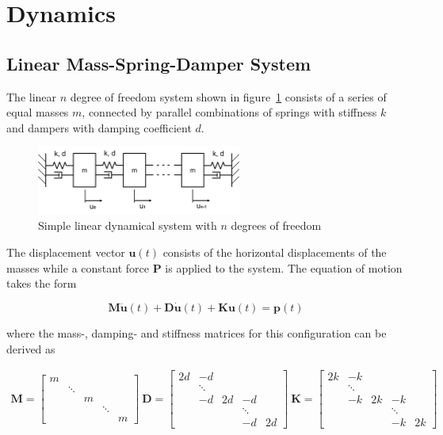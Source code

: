 \newpage
\section{Dynamics}

\subsection*{Linear Mass-Spring-Damper System}

The linear $n$ degree of freedom system shown in figure~\ref{fig:verification:linear-fmd} consists of a series of equal masses $m$, connected by parallel combinations of springs with stiffness $k$ and dampers with damping coefficient $d$.

\begin{figure}[h]
\centering
\includegraphics[width=0.6\textwidth]{figures/verification/mass-spring-damper}
\caption{Simple linear dynamical system with $n$ degrees of freedom}
\label{fig:verification:linear-fmd}
\end{figure}

The displacement vector $\boldsymbol{u}(t)$ consists of the horizontal displacements of the masses while a constant force $\boldsymbol{P}$ is applied to the system.
The equation of motion takes the form

\begin{equation}
\boldsymbol{M}\ddot{\boldsymbol{u}}(t) + \boldsymbol{D}\dot{\boldsymbol{u}}(t) + \boldsymbol{K}\boldsymbol{u}(t) = \boldsymbol{p}(t) \label{eq:verification:linear-fmd}
\end{equation}

where the mass-, damping- and stiffness matrices for this configuration can be derived as

\begin{align}
\boldsymbol{M} =
\begin{bmatrix}
m \\
& \ddots \\
&& m \\
&&& \ddots \\
&&&& m
\end{bmatrix}
 \
\boldsymbol{D} =
\begin{bmatrix}
2d & -d \\
& \ddots \\
& -d & 2d & -d \\
&&& \ddots \\
&&& -d & 2d
\end{bmatrix}
 \
\boldsymbol{K} =
\begin{bmatrix}
2k & -k \\
& \ddots \\
& -k & 2k & -k \\
&&& \ddots \\
&&& -k & 2k
\end{bmatrix}
\end{align}

